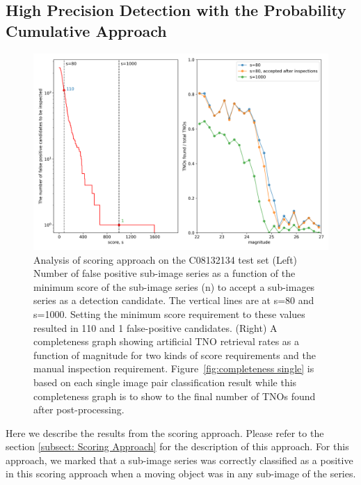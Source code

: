 \documentclass{aastex631}
\begin{document}
\subsection{High Precision Detection with the Probability Cumulative Approach}
\label{subsect: High precision with the Probability Cumulative Approach}

\begin{figure}[ht]
    \centering
    \includegraphics[width=\textwidth,keepaspectratio]{Figures/completeness_with_score.png}
    \caption{Analysis of scoring approach on the C08132134 test set (Left) Number of false positive sub-image series as a function of the minimum score of the sub-image series (n) to accept a sub-images series as a detection candidate.
    The vertical lines are at s=80 and s=1000.
    Setting the minimum score requirement to these values resulted in 110 and 1 false-positive candidates.
    (Right) A completeness graph showing artificial TNO retrieval rates as a function of magnitude for two kinds of score requirements and the manual inspection requirement.
    Figure~\ref{fig:completeness single} is based on each single image pair classification result while this completeness graph is to show to the final number of TNOs found after post-processing.
    }
    \label{fig:completeness with movies}
\end{figure}

Here we describe the results from the scoring approach.
Please refer to the section \ref{subsect: Scoring Approach} for the description of this approach.
For this approach, we marked that a sub-image series was correctly classified as a positive in this scoring approach when a moving object was in any sub-image of the series.
\end{document}
